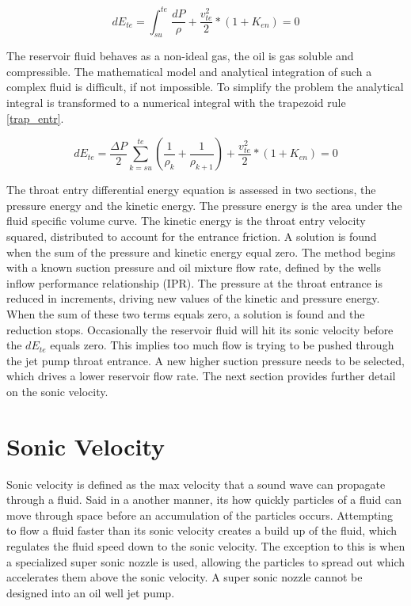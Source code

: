 \documentclass{article}
\begin{document}
\begin{equation}
dE_{te} = \int_{su}^{te} \frac{dP}{\rho} + \frac{v_{te}^{2}}{2} * (1+K_{en}) = 0
\label{diff_entr}
\end{equation}

The reservoir fluid behaves as a non-ideal gas, the oil is gas soluble and compressible. The mathematical model and analytical integration of such a complex fluid is difficult, if not impossible. To simplify the problem the analytical integral is transformed to a numerical integral with the trapezoid rule \eqref{trap_entr}.

\begin{equation}
dE_{te} = \frac{\Delta P}{2}\sum_{k=su}^{te} (\frac{1}{\rho_{k}} + \frac{1}{\rho_{k+1}}) + \frac{v_{te}^{2}}{2} * (1+K_{en}) = 0
\label{trap_entr}
\end{equation}

The throat entry differential energy equation is assessed in two sections, the pressure energy and the kinetic energy. The pressure energy is the area under the fluid specific volume curve. The kinetic energy is the throat entry velocity squared, distributed to account for the entrance friction. A solution is found when the sum of the pressure and kinetic energy equal zero. The method begins with a known suction pressure and oil mixture flow rate, defined by the wells inflow performance relationship (IPR). The pressure at the throat entrance is reduced in increments, driving new values of the kinetic and pressure energy. When the sum of these two terms equals zero, a solution is found and the reduction stops. Occasionally the reservoir fluid will hit its sonic velocity before the $dE_{te}$ equals zero. This implies too much flow is trying to be pushed through the jet pump throat entrance. A new higher suction pressure needs to be selected, which drives a lower reservoir flow rate. The next section provides further detail on the sonic velocity.

\section{Sonic Velocity}

Sonic velocity is defined as the max velocity that a sound wave can propagate through a fluid. Said in a another manner, its how quickly particles of a fluid can move through space before an accumulation of the particles occurs. Attempting to flow a fluid faster than its sonic velocity creates a build up of the fluid, which regulates the fluid speed down to the sonic velocity. The exception to this is when a specialized super sonic nozzle is used, allowing the particles to spread out which accelerates them above the sonic velocity. A super sonic nozzle cannot be designed into an oil well jet pump.
\end{document}
